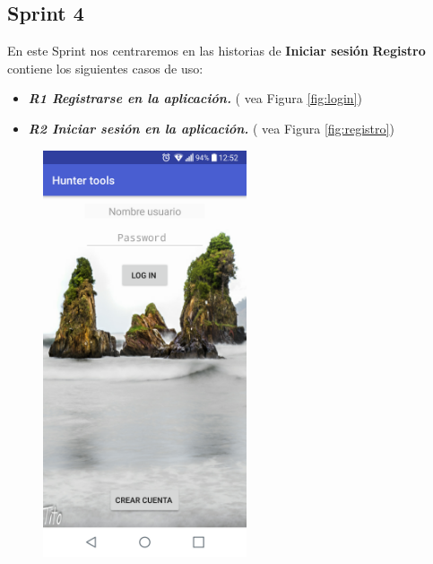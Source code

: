 \subsection{Sprint 4}

En este Sprint nos centraremos en las historias de  \textbf{Iniciar sesión }
\textbf{Registro} contiene los siguientes casos de uso:



\begin{itemize}
\item\textbf{ \textit{R1  Registrarse en la aplicación.}}  ( vea Figura \ref{fig:login})
\item \textbf{\textit{R2 Iniciar sesión en la aplicación. }}  ( vea Figura \ref{fig:registro})

\end{itemize} 
\begin{figure}[htbp]
\begin{minipage}[b]{0.5\linewidth} %
\centering
\includegraphics[width=6cm]{capturamovil/login.png}


\end{minipage}
\end{figure}
